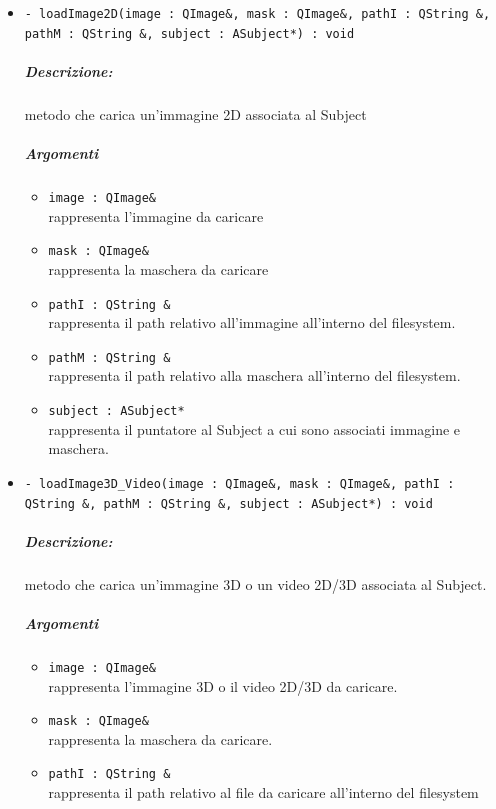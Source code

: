 		\begin{itemize}
			\item \color{blue} \verb!- loadImage2D(image : QImage&, mask : QImage&, pathI : QString &, pathM : QString &, subject : ASubject*) : void!
			\color{black}
			\subparagraph{Descrizione:} metodo che carica un'immagine 2D associata al Subject\g{}
			\color{black}
			\subparagraph{Argomenti}
			\begin{itemize}
				\item \color{RoyalPurple} \verb!image : QImage&!\\				
\color{black} rappresenta l'immagine da caricare
				\item \color{RoyalPurple} \verb!mask : QImage&!\\				
\color{black} rappresenta la maschera da caricare
				\item \color{RoyalPurple} \verb!pathI : QString &!\\				
\color{black} rappresenta il path relativo all'immagine all'interno del filesystem.
				\item \color{RoyalPurple} \verb!pathM : QString &!\\				
\color{black} rappresenta il path relativo alla maschera all'interno del filesystem.
				\item \color{RoyalPurple} \verb!subject : ASubject*!\\				
\color{black} rappresenta il puntatore al Subject\g{} a cui sono associati immagine e maschera.
			\end{itemize}
			\item \color{blue} \verb!- loadImage3D_Video(image : QImage&, mask : QImage&, pathI : QString &, pathM : QString &, subject : ASubject*) : void!
			\color{black}
			\subparagraph{Descrizione:} metodo che carica un'immagine 3D o un video 2D/3D associata al Subject{}.
			\color{black}
			\subparagraph{Argomenti}
			\begin{itemize}
				\item \color{RoyalPurple} \verb!image : QImage&!\\				
\color{black} rappresenta l'immagine 3D o il video 2D/3D  da caricare.
				\item \color{RoyalPurple} \verb!mask : QImage&!\\				
\color{black} rappresenta la maschera da caricare.
				\item \color{RoyalPurple} \verb!pathI : QString &!\\				
\color{black} rappresenta il path relativo al file da caricare all'interno del filesystem

\end{itemize}
\end{itemize}
